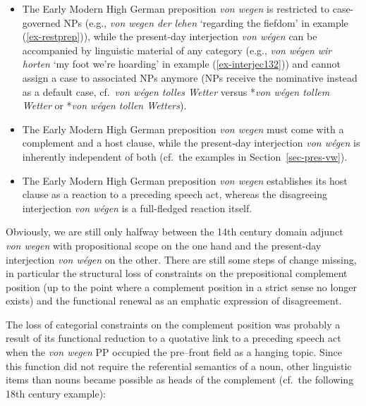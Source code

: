 \documentclass[output=paper
  ,nobabel
  ,draftmode
  ,babelshorthands
  ,colorlinks, citecolor=brown
]{langscibook}
\begin{document}
\begin{itemize}
\item The Early Modern High German preposition \emph{von wegen} is restricted to case-governed NPs (e.g., \emph{von wegen der lehen} `regarding the fiefdom' in example (\ref{ex-restprep})), while the present-day  interjection \emph{von wégen} can be accompanied by linguistic material of any category (e.g., \emph{von wégen wir horten} `my foot we’re hoarding' in example (\ref{ex-interjec132})) and cannot assign a case to associated NPs anymore (NPs receive the nominative instead as a default case, cf.\ \emph{von wégen tolles Wetter} versus *\emph{von wégen tollem Wetter} or *\emph{von wégen tollen Wetters}).

\item The Early Modern High German preposition \emph{von wegen} must come with a complement and a host clause, while the present-day  interjection \emph{von wégen} is inherently independent of both (cf.\ the examples in Section~\ref{sec-pres-vw}).

\item The Early Modern High German preposition \emph{von wegen} establishes its host clause as a reaction to a preceding speech act, whereas the disagreeing interjection \emph{von wégen} is a full-fledged reaction itself.
\end{itemize}

\largerpage
\noindent
Obviously, we are still only halfway between the 14th century domain adjunct \emph{von wegen} with propositional scope on the one hand and the present-day  interjection \emph{von wégen} on the other. There are still some steps of change missing, in particular the structural loss of constraints on the prepositional complement position (up to the point where a complement position in a strict sense no longer exists) and the functional renewal as an emphatic expression of disagreement.

The loss of categorial constraints on the complement position was probably a result of its functional reduction to a quotative link to a preceding speech act when the \emph{von wegen} PP occupied the pre--front field as a hanging topic. Since this function did not require the referential semantics of a noun, other linguistic items than nouns became possible as heads of the complement (cf.\ the following 18th century example):
\end{document}
